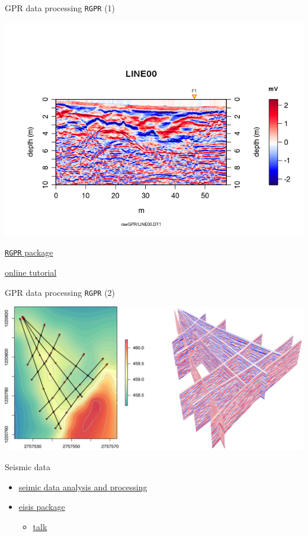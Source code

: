 \documentclass[8pt,ignorenonframetext,]{beamer}
\providecommand{\tightlist}{%
  \setlength{\itemsep}{0pt}\setlength{\parskip}{0pt}}
\begin{document}
\begin{frame}[fragile]{GPR data processing \texttt{RGPR} (1)}

\includegraphics{imgPres/GPR_processing02.png}

\href{https://github.com/emanuelhuber/RGPR}{\texttt{RGPR} package}

\href{http://emanuelhuber.github.io/RGPR/}{online tutorial}

\end{frame}

\begin{frame}{GPR data processing \texttt{RGPR} (2)}

\includegraphics{imgPres/GPR_processing01.png}

\end{frame}

\begin{frame}{Seismic data}

\begin{itemize}
\tightlist
\item
  \href{http://mazamascience.com/Classes/IRIS_2015/}{seimic data
  analysis and processing}
\item
  \href{https://www.earth-surf-dynam-discuss.net/esurf-2017-75/esurf-2017-75.pdf}{eisis
  package}

  \begin{itemize}
  \tightlist
  \item
    \href{http://www.unc.edu/~leesj/FETCH/GRAB/Vignettes/whyRbeam.pdf}{talk}
  \end{itemize}
\end{itemize}

\end{frame}
\end{document}
